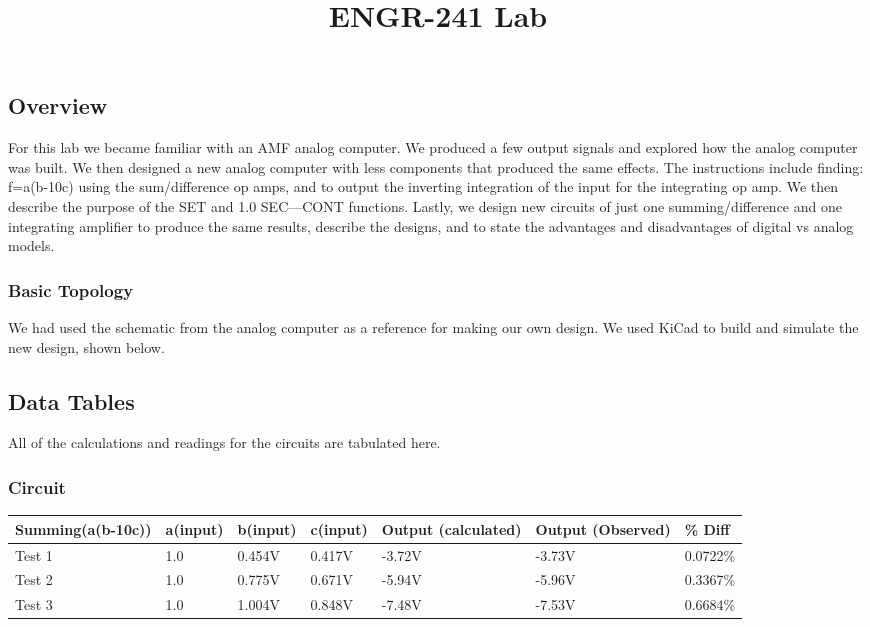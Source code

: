 \documentclass[11pt]{article}
\title{ENGR-241 Lab }
\author{}
\begin{document}
\subsection*{Overview}
	For this lab we became familiar with an AMF analog computer. We produced a few output signals and explored how the analog computer was built. We then designed a new analog computer with less components that produced the same effects. The instructions include finding: f=a(b-10c) using the sum/difference op amps, and to output the inverting integration of the input for the integrating op amp. We then describe the purpose of the SET and 1.0 SEC---CONT functions. Lastly, we design new circuits of just one summing/difference and one integrating amplifier to produce the same results, describe the designs, and to state the advantages and disadvantages of digital vs analog models. 
\subsubsection*{Basic Topology}
We had used the schematic from the analog computer as a reference for making our own design. We used KiCad to build and simulate the new design, shown below. 
	\subsection*{Data Tables}
All of the calculations and readings for the circuits are tabulated here.\\
\subsubsection*{Circuit}
\begin{table}[h]
	\def\arraystretch{1.2}%
	\begin{tabular}{|l|l|l|l|l|l|l|}
		\hline
		Summing(a(b-10c))	& a(input) 		& b(input)	& c(input)	& Output (calculated)		& Output (Observed) 	& \% Diff			\\ \hline
		Test 1		& 1.0			& 0.454V	& 0.417V	& -3.72V					& -3.73V				&0.0722\%				\\ \hline
		Test 2		& 1.0			& 0.775V	& 0.671V	& -5.94V					& -5.96V				&0.3367\%				\\ \hline
		Test 3		& 1.0			& 1.004V	& 0.848V	& -7.48V					& -7.53V				&0.6684\%				\\ \hline
	
		
	\end{tabular}
\end{table}
\end{document}

